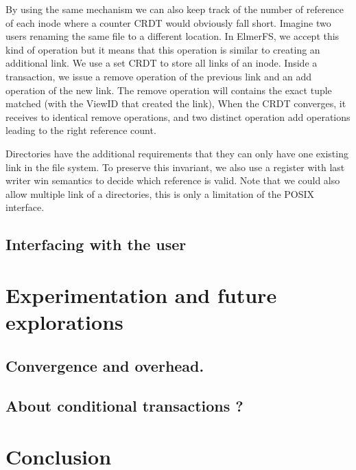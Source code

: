 \documentclass[sigplan, 10pt]{acmart}
\begin{document}
By using the same mechanism we can also keep track of the number of reference
of each inode where a counter CRDT would obviously fall short. Imagine two users
renaming the same file to a different location. In ElmerFS, we accept this kind
of operation but it means that this operation is similar to creating an additional link. We use a set CRDT to store all links of an inode. Inside a transaction,
we issue a remove operation of the previous link and an add operation of the new link. The remove operation will contains the exact tuple matched
(with the ViewID that created the link), When the CRDT converges, it receives to identical remove operations, and two distinct operation add operations leading to the right reference count.

Directories have the additional requirements that they can only have one existing link
in the file system. To preserve this invariant, we also use a register with last writer win semantics to decide which reference is valid. Note that
we could also allow multiple link of a directories, this is only a limitation of the POSIX interface.

\subsection{Interfacing with the user}

\section{Experimentation and future explorations}

\subsection{Convergence and overhead.}
\subsection{About conditional transactions ?}

\section{Conclusion}
\end{document}
